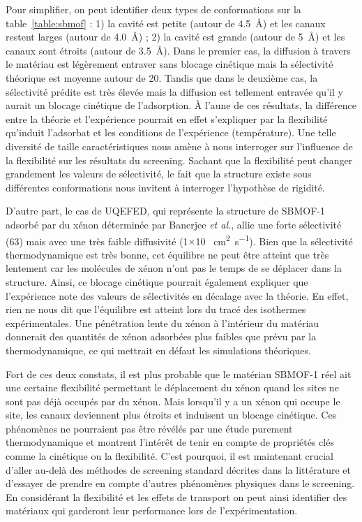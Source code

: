 \documentclass[main]{subfiles}
\begin{document}

Pour simplifier, on peut identifier deux types de conformations sur la table~\ref{table:sbmof} : 1) la cavité est petite (autour de \SI{4,5}{\angstrom}) et les canaux restent larges (autour de \SI{4,0}{\angstrom}) ; 2) la cavité est grande (autour de \SI{5}{\angstrom}) et les canaux sont étroits (autour de \SI{3,5}{\angstrom}). Dans le premier cas, la diffusion à travers le matériau est légèrement entraver sans blocage cinétique mais la sélectivité théorique est moyenne autour de 20. Tandis que dans le deuxième cas, la sélectivité prédite est très élevée mais la diffusion est tellement entravée qu'il y aurait un blocage cinétique de l'adsorption. \`A l'aune de ces résultats, la différence entre la théorie et l'expérience pourrait en effet s'expliquer par la flexibilité qu'induit l'adsorbat et les conditions de l'expérience (température). Une telle diversité de taille caractéristiques nous amène à nous interroger sur l'influence de la flexibilité sur les résultats du screening. Sachant que la flexibilité peut changer grandement les valeurs de sélectivité, le fait que la structure existe sous différentes conformations nous invitent à interroger l'hypothèse de rigidité.\autocite{Witman_2017} 

D'autre part, le cas de UQEFED, qui représente la structure de SBMOF-1 adsorbé par du xénon déterminée par Banerjee \emph{et al.},\autocite{Banerjee_2016} allie une forte sélectivité (63) mais avec une très faible diffusivité (1$\times$10 \SI{}{\square\centi\meter\per\second}). Bien que la sélectivité thermodynamique est très bonne, cet équilibre ne peut être atteint que très lentement car les molécules de xénon n'ont pas le temps de se déplacer dans la structure. Ainsi, ce blocage cinétique pourrait également expliquer que l'expérience note des valeurs de sélectivités en décalage avec la théorie. En effet, rien ne nous dit que l'équilibre est atteint lors du tracé des isothermes expérimentales. Une pénétration lente du xénon à l'intérieur du matériau donnerait des quantités de xénon adsorbées plus faibles que prévu par la thermodynamique, ce qui mettrait en défaut les simulations théoriques. 

Fort de ces deux constats, il est plus probable que le matériau SBMOF-1 réel ait une certaine flexibilité permettant le déplacement du xénon quand les sites ne sont pas déjà occupés par du xénon. Mais lorsqu'il y a un xénon qui occupe le site, les canaux deviennent plus étroits et induisent un blocage cinétique. Ces phénomènes ne pourraient pas être révélés par une étude purement thermodynamique et montrent l'intérêt de tenir en compte de propriétés clés comme la cinétique ou la flexibilité. C'est pourquoi, il est maintenant crucial d'aller au-delà des méthodes de screening standard décrites dans la littérature et d'essayer de prendre en compte d'autres phénomènes physiques dans le screening. En considérant la flexibilité et les effets de transport on peut ainsi identifier des matériaux qui garderont leur performance lors de l'expérimentation.
\end{document}

